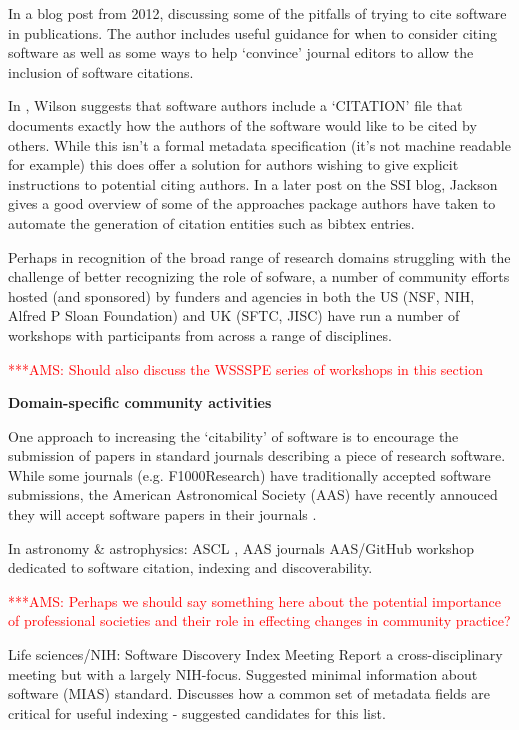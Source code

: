 \documentclass[11pt, oneside]{amsart}
\newcommand{\asnote}[1]{ {\textcolor{red} { ***AMS: #1 }}}
\begin{document}
In a blog post from 2012, \cite{ssi-how-to-cite} discussing some of the pitfalls of trying to cite software in publications.
The author includes useful guidance for when to consider citing software as well as some ways to help `convince' journal editors
to allow the inclusion of software citations.

In \cite{ssi-citation-files}, Wilson suggests that software authors include a `CITATION' file that documents exactly how the
authors of the software would like to be cited by others. While this isn't a formal metadata specification (it's not machine
readable for example) this does offer a solution for authors wishing to give explicit instructions to potential citing authors.
In a later post on the SSI blog, Jackson \cite{ssi-how-shalt-i-cite-thee} gives a good overview of some of the approaches
package authors have taken to automate the generation of citation entities such as bibtex entries.

Perhaps in recognition of the broad range of research domains struggling with the challenge of better recognizing the role of sofware, a number of community efforts hosted (and sponsored) by funders and agencies in both the US (NSF, NIH, Alfred P Sloan Foundation) and UK (SFTC, JISC) have run a number of workshops with participants from across a range of disciplines.

\asnote{Should also discuss the WSSSPE \cite{wssspe} series of workshops in this section}

\textbf{Domain-specific community activities}

One approach to increasing the `citability' of software is to encourage the submission of papers in standard journals describing a piece of research software. While some journals (e.g. F1000Research) have traditionally accepted software submissions, the American Astronomical Society (AAS) have recently annouced they will accept software papers in their journals \cite{aas-sofware-papers}.

In astronomy \& astrophysics: ASCL \cite{ascl}, AAS journals  AAS/GitHub
workshop \cite{aas-software-index} dedicated to software citation, indexing and discoverability.

\asnote{Perhaps we should say something here about the potential importance of professional societies and their role in effecting changes in community practice?}

Life sciences/NIH: Software Discovery Index Meeting Report \cite{software-discovery-index} a cross-disciplinary meeting
but with a largely NIH-focus. Suggested minimal information about software (MIAS) standard. Discusses how a common set of metadata
fields are critical for useful indexing - suggested candidates for this list.
\end{document}

